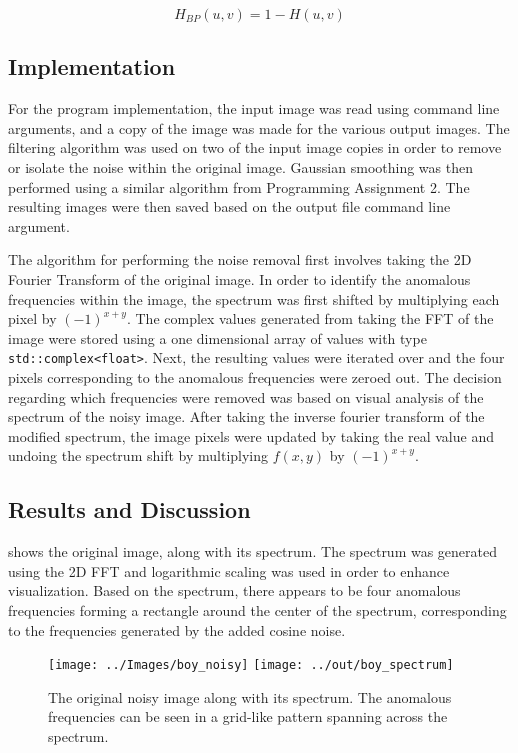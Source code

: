 \documentclass[headings=optiontoheadandtoc,listof=totoc,parskip=full]{scrartcl}
\begin{document}
\[
	H_{BP}(u,v) = 1 - H(u,v)
\]


\subsection{Implementation}

For the program implementation, the input image was read using command line arguments, and a copy of the image was made for the various output images. The filtering algorithm was used on two of the input image copies in order to remove or isolate the noise within the original image. Gaussian smoothing was then performed using a similar algorithm from Programming Assignment 2. The resulting images were then saved based on the output file command line argument.

The algorithm for performing the noise removal first involves taking the 2D Fourier Transform of the original image. In order to identify the anomalous frequencies within the image, the spectrum was first shifted by multiplying each pixel by \((-1)^{x + y}\). The complex values generated from taking the FFT of the image were stored using a one dimensional array of values with type \texttt{std::complex<float>}. Next, the resulting values were iterated over and the four pixels corresponding to the anomalous frequencies were zeroed out. The decision regarding which frequencies were removed was based on visual analysis of the spectrum of the noisy image. After taking the inverse fourier transform of the modified spectrum, the image pixels were updated by taking the real value and undoing the spectrum shift by multiplying $f(x,y)$ by \((-1)^{x + y}\).

\subsection{Results and Discussion}

 shows the original image, along with its spectrum. The spectrum was generated using the 2D FFT and logarithmic scaling was used in order to enhance visualization. Based on the spectrum, there appears to be four anomalous frequencies forming a rectangle around the center of the spectrum, corresponding to the frequencies generated by the added cosine noise. 

\begin{figure}[H]
	\centering
	\texttt{[image: ../Images/boy\_noisy]}
	\texttt{[image: ../out/boy\_spectrum]}
	\caption{The original noisy image along with its spectrum. The anomalous frequencies can be seen in a grid-like pattern spanning across the spectrum.}
	\label{fig:boyNoisy}
\end{figure}
\end{document}
